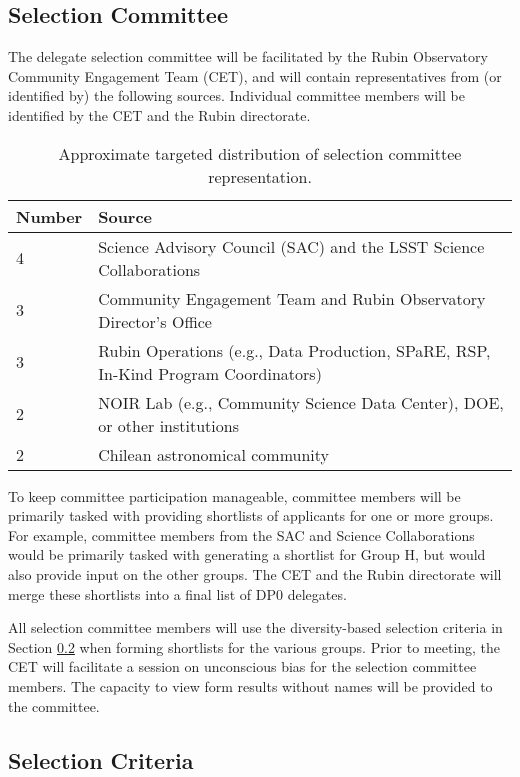 \documentclass[DM,lsstdraft,authoryear,toc]{lsstdoc}
\begin{document}
\subsection{Selection Committee}\label{ssec:sel_comm}

The delegate selection committee will be facilitated by the Rubin Observatory Community Engagement Team (CET), and will contain representatives from (or identified by) the following sources.
Individual committee members will be identified by the CET and the Rubin directorate.

\begin{table}[!h]
\centering
\caption{Approximate targeted distribution of selection committee representation.}\label{tab:selection_committee}
\begin{tabular}{ll}
\hline
Number & Source \\
\hline \hline
4 & Science Advisory Council (SAC) and the LSST Science Collaborations \\
3 & Community Engagement Team and Rubin Observatory Director's Office \\
3 & Rubin Operations (e.g., Data Production, SPaRE, RSP, In-Kind Program Coordinators) \\
2 & NOIR Lab (e.g., Community Science Data Center), DOE, or other institutions \\
2 & Chilean astronomical community \\
\hline
\end{tabular}
\end{table}

To keep committee participation manageable, committee members will be primarily tasked with providing shortlists of applicants for one or more groups.
For example, committee members from the SAC and Science Collaborations would be primarily tasked with generating a shortlist for Group H, but would also provide input on the other groups.
The CET and the Rubin directorate will merge these shortlists into a final list of DP0 delegates.

All selection committee members will use the diversity-based selection criteria in Section \ref{ssec:sel_crit} when forming shortlists for the various groups.
Prior to meeting, the CET will facilitate a session on unconscious bias for the selection committee members.
The capacity to view form results without names will be provided to the committee.

\subsection{Selection Criteria}\label{ssec:sel_crit}
\end{document}
